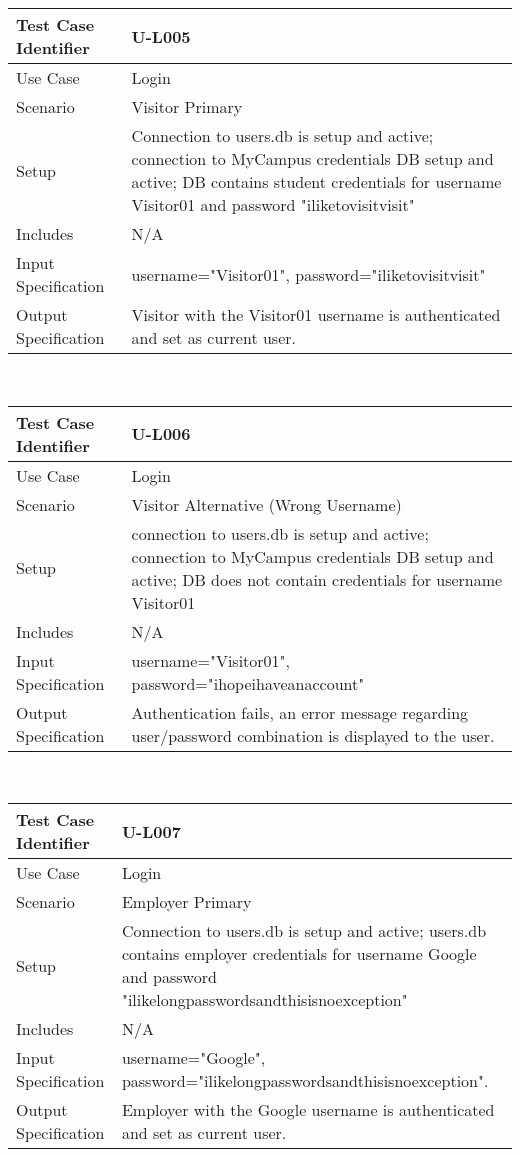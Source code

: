 \documentclass{l3deliverable}
\begin{document}
\begin{tabular}{lp{10cm}}
\hline 
\textbf{Test Case Identifier} & U-L005\tabularnewline
\hline 
\hline 
Use Case & Login \tabularnewline
\hline 
Scenario & Visitor Primary \tabularnewline
\hline 
Setup &  Connection to users.db is setup and active; connection to MyCampus credentials DB setup and active; DB contains student credentials for username Visitor01 and password "iliketovisitvisit" \tabularnewline
\hline 
Includes &  N/A \tabularnewline
\hline 
Input Specification & username="Visitor01", password="iliketovisitvisit"\tabularnewline
\hline 
Output Specification &  Visitor with the Visitor01 username is authenticated and set as current user.\tabularnewline
\hline 
\end{tabular}\\


\begin{tabular}{lp{10cm}}
\hline 
\textbf{Test Case Identifier} & U-L006 \tabularnewline
\hline 
\hline 
Use Case & Login \tabularnewline
\hline 
Scenario & Visitor Alternative (Wrong Username) \tabularnewline
\hline 
Setup & connection to users.db is setup and active; connection to MyCampus credentials DB setup and active; DB does not contain credentials for username Visitor01 \tabularnewline
\hline 
Includes & N/A \tabularnewline
\hline 
Input Specification & username="Visitor01", password="ihopeihaveanaccount"  \tabularnewline
\hline 
Output Specification & Authentication fails, an error message regarding user/password combination is displayed to the user.\tabularnewline
\hline 
\end{tabular}\\


\begin{tabular}{lp{10cm}}
\hline 
\textbf{Test Case Identifier} & U-L007\tabularnewline
\hline 
\hline 
Use Case & Login \tabularnewline
\hline 
Scenario & Employer Primary \tabularnewline
\hline 
Setup & Connection to users.db is setup and active; users.db contains employer credentials for username Google and password "ilikelongpasswordsandthisisnoexception" \tabularnewline
\hline 
Includes & N/A \tabularnewline
\hline 
Input Specification & username="Google", password="ilikelongpasswordsandthisisnoexception".\tabularnewline
\hline 
Output Specification & Employer with the Google username is authenticated and set as current user.\tabularnewline
\hline 
\end{tabular}\\
\end{document}
